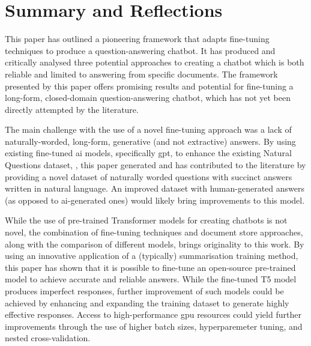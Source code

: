 \chapter{Summary and Reflections}\label{ch:summary}
This paper has outlined a pioneering framework that adapts fine-tuning techniques to produce a question-answering chatbot. It has produced and critically analysed three potential approaches to creating a chatbot which is both reliable and limited to answering from specific documents. The framework presented by this paper offers promising results and potential for fine-tuning a long-form, closed-domain question-answering chatbot, which has not yet been directly attempted by the literature. 

The main challenge with the use of a novel fine-tuning approach was a lack of naturally-worded, long-form, generative (and not extractive) answers. By using existing fine-tuned \acrlong{ai} models, specifically \acrshort{gpt}, to enhance the existing Natural Questions dataset, \citep{NQdataset}, this paper generated and has contributed to the literature by providing a novel dataset of naturally worded questions with succinct answers written in natural language. An improved dataset with human-generated answers (as opposed to \acrshort{ai}-generated ones) would likely bring improvements to this model.

While the use of pre-trained Transformer models for creating chatbots is not novel, the combination of fine-tuning techniques and document store approaches, along with the comparison of different models, brings originality to this work. By using an innovative application of a (typically) summarisation training method, this paper has shown that it is possible to fine-tune an open-source pre-trained model to achieve accurate and reliable answers. While the fine-tuned T5 model produces imperfect responses, further improvement of such models could be achieved by enhancing and expanding the training dataset to generate highly effective responses. Access to high-performance \acrshort{gpu} resources could yield further improvements through the use of higher batch sizes, hyperparemeter tuning, and nested cross-validation.

